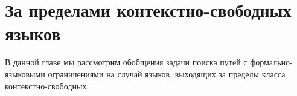 \setchapterpreamble[u]{\margintoc}
\chapter{За пределами контекстно-свободных языков}
\label{chpt:BeyondCFL}

В данной главе мы рассмотрим обобщения задачи поиска путей с формально-языковыми ограничениями на случай языков, выходящих за пределы класса контекстно-свободных.



